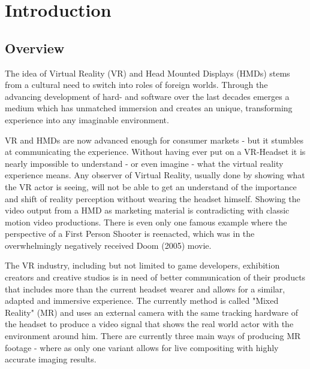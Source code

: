 %
\chapter{Introduction}
\label{sec:intro}


\Blindtext[2][2]

\section{Overview}
\label{sec:intro:outline}

The idea of Virtual Reality (VR) and Head Mounted Displays (HMDs) stems from a 
cultural need to switch into roles of foreign worlds. Through the advancing 
development of hard- and software over the last decades emerges a medium which 
has unmatched immersion and creates an unique, transforming experience into any 
imaginable environment.

VR and HMDs are now advanced enough for consumer markets - but it stumbles at 
communicating the experience. Without having ever put on a VR-Headset it is 
nearly impossible to understand - or even imagine - what the virtual reality 
experience means. Any observer of Virtual Reality, usually done by showing what 
the VR actor is seeing, will not be able to get an understand of the importance 
and shift of reality perception without wearing the headset himself.
\newline
Showing the video output from a HMD as marketing material is contradicting with 
classic motion video productions. There is even only one famous example where 
the perspective of a First Person Shooter is reenacted, which was in the 
overwhelmingly negatively received Doom (2005) movie.

The VR industry, including but not limited to game developers, exhibition 
creators and creative studios is in need of better communication of their 
products that includes more than the current headset wearer and allows for a 
similar, adapted and immersive experience.
\newline
The currently method is called "Mixed Reality" (MR) and uses an external camera 
with the same tracking hardware of the headset to produce a video signal that 
shows the real world actor with the environment around him. There are currently 
three main ways of producing MR footage - where as only one variant allows for 
live compositing with highly accurate imaging results.


